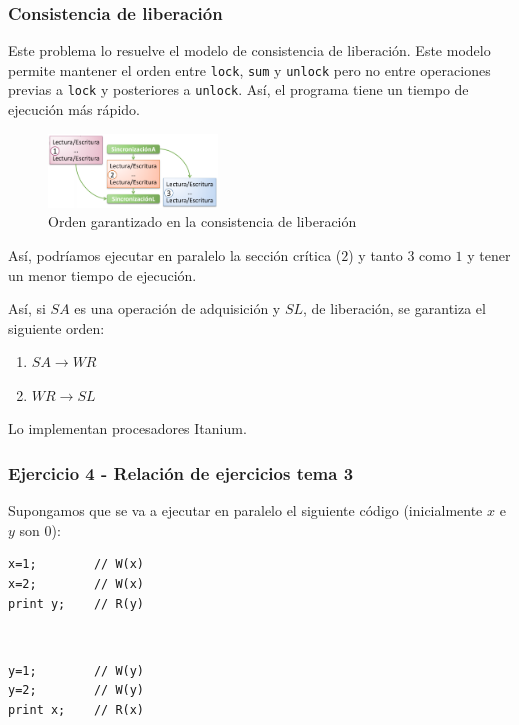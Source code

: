 \documentclass[10pt,a4paper,spanish]{report}
\begin{document}
\textcolor[rgb]{0.2,0.4,0.8}{\subsubsection{Consistencia de liberación}}
Este problema lo resuelve el modelo de consistencia de liberación. Este modelo permite mantener el orden entre \verb*|lock|, \verb*|sum| y \verb*|unlock| pero no entre operaciones previas a \verb*|lock| y posteriores a \verb*|unlock|. Así, el programa tiene un tiempo de ejecución más rápido.

\begin{figure}[!h]
\centering
\includegraphics[width=0.4\textwidth]{77}
\caption{Orden garantizado en la consistencia de liberación}
\label{orden_con_l}
\end{figure}

Así, podríamos ejecutar en paralelo la sección crítica ($2$) y tanto $3$ como $1$ y tener un menor tiempo de ejecución.

Así, si $SA$ es una operación de adquisición y $SL$, de liberación, se garantiza el siguiente orden:
\begin{enumerate}[\color{azul}{\bf $\heartsuit$}]
    \item \textcolor[rgb]{0.2,0.4,0.8}{$SA \rightarrow WR$}
    \item \textcolor[rgb]{0.2,0.4,0.8}{$WR \rightarrow SL$}
\end{enumerate}

Lo implementan procesadores Itanium.

\textcolor[rgb]{0.2,0.4,0.8}{\subsubsection{Ejercicio 4 - Relación de ejercicios tema 3}}
Supongamos que se va a ejecutar en paralelo el siguiente código (inicialmente $x$ e $y$ son $0$):

\begin{center}
\begin{minipage}{0.3\textwidth}
\begin{verbatim}
x=1;        // W(x)
x=2;        // W(x)
print y;    // R(y)
\end{verbatim}
\end{minipage}
\begin{minipage}{0.3\textwidth}
\textcolor{White}{.}
\end{minipage}
\begin{minipage}{0.3\textwidth}
\begin{verbatim}
y=1;        // W(y)
y=2;        // W(y)
print x;    // R(x)
\end{verbatim}
\end{minipage}
\end{center}
\end{document}
